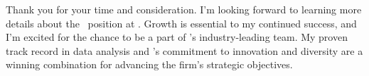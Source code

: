 
Thank you for your time and consideration. I'm looking forward to learning more details about the \position\ position at \company. Growth is essential to my continued success, and I'm excited for the chance to be a part of \company's industry-leading team. My proven track record in data analysis and \company's commitment to innovation and diversity are a winning combination for advancing the firm's strategic objectives.
